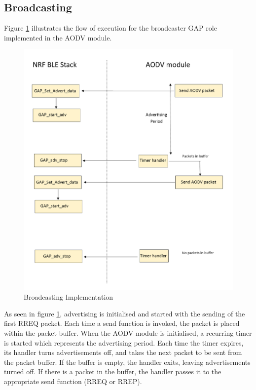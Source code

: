       \subsection{Broadcasting}
    Figure \ref{fig:broadcaster} illustrates the flow of execution for the broadcaster
    GAP role implemented in the AODV module.

    \FloatBarrier
    \begin{figure}[ht]
      \includegraphics[width=\textwidth]{Images/chapter4/broadcaster_flow.png}
      \caption{Broadcasting Implementation}
      \label{fig:broadcaster}
    \end{figure}
    \FloatBarrier

    As seen in figure \ref{fig:broadcaster}, advertising is initialised and started with the sending of the first RREQ
    packet. Each time a send function is invoked, the packet is placed within
    the packet buffer. When the AODV module is initialised, a recurring timer is
    started which represents the advertising period. Each time the timer
    expires, its handler turns advertisements off, and takes the next packet to
    be sent from the packet buffer. If the buffer is empty, the handler exits,
    leaving advertisements turned off. If there is a packet in the buffer, the
    handler passes it to the appropriate send function (RREQ or RREP).

